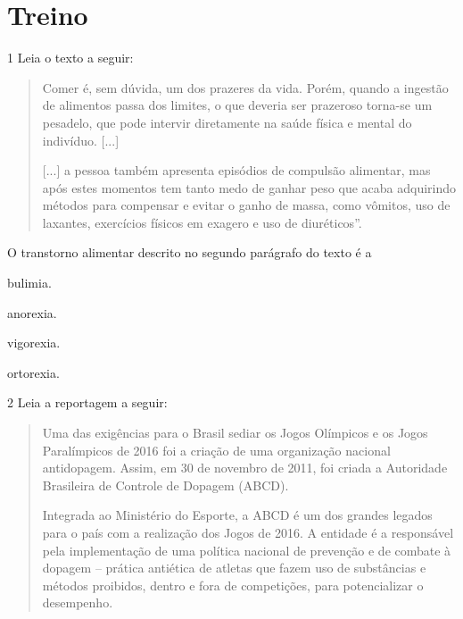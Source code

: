 \section{Treino}

\num{1} Leia o texto a seguir:

\begin{quote}
Comer é, sem dúvida, um dos prazeres da vida. Porém, quando a ingestão
de alimentos passa dos limites, o que deveria ser prazeroso torna-se um
pesadelo, que pode intervir diretamente na saúde física e mental do
indivíduo. {[}...{]}

{[}...{]} a pessoa também apresenta episódios de compulsão alimentar,
mas após estes momentos tem tanto medo de ganhar peso que acaba
adquirindo métodos para compensar e evitar o ganho de massa, como
vômitos, uso de laxantes, exercícios físicos em exagero e uso de
diuréticos''.

\end{quote}

O transtorno alimentar descrito no segundo parágrafo do texto é a

\begin{escolha}
\item bulimia.

\item anorexia.

\item vigorexia.

\item ortorexia.
\end{escolha}


\num{2} Leia a reportagem a seguir:

\begin{quote}
Uma das exigências para o Brasil sediar os Jogos Olímpicos e os Jogos
Paralímpicos de 2016 foi a criação de uma organização nacional
antidopagem. Assim, em 30 de novembro de 2011, foi criada a Autoridade
Brasileira de Controle de Dopagem (ABCD).

Integrada ao Ministério do Esporte, a ABCD é um dos grandes legados para
o país com a realização dos Jogos de 2016. A entidade é a responsável
pela implementação de uma política nacional de prevenção e de combate à
dopagem -- prática antiética de atletas que fazem uso de substâncias e
métodos proibidos, dentro e fora de competições, para potencializar o
desempenho.

\end{quote}

